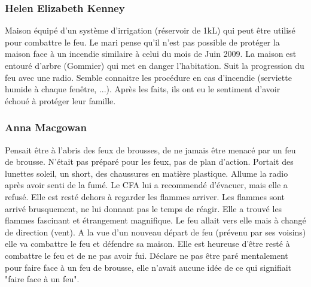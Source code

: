            \subsubsection{Helen Elizabeth Kenney}
                Maison équipé d'un système d'irrigation (réservoir de 1kL) qui peut être utilisé pour combattre le feu.
                Le mari pense qu'il n'est pas possible de protéger la maison face à un incendie similaire à celui du mois de Juin 2009.
                La maison est entouré d'arbre (Gommier) qui met en danger l'habitation.
                Suit la progression du feu avec une radio.
                Semble connaitre les procédure en cas d'incendie (serviette humide à chaque fenêtre, ...).
                Après les faits, ils ont eu le sentiment d'avoir échoué à protéger leur famille.

            \subsubsection{Anna Macgowan}
                Pensait être à l'abris des feux de brousses, de ne jamais être menacé par un feu de brousse.
                N'était pas préparé pour les feux, pas de plan d'action.
                Portait des lunettes soleil, un short, des chaussures en matière plastique.
                Allume la radio après avoir senti de la fumé.
                Le CFA lui a recommendé d'évacuer, mais elle a refusé.
                Elle est resté dehors à regarder les flammes arriver.
                Les flammes sont arrivé brusquement, ne lui donnant pas le temps de réagir.
                Elle a trouvé les flammes fascinant et étrangement magnifique.
                Le feu allait vers elle mais à changé de direction (vent).
                A la vue d'un nouveau départ de feu (prévenu par ses voisins) elle va combattre le feu
                et défendre sa maison.
                Elle est heureuse d'être resté à combattre le feu et de ne pas avoir fui.
                Déclare ne pas être paré mentalement pour faire face à un feu de brousse, elle n'avait aucune idée de ce qui
                signifiait "faire face à un feu".

